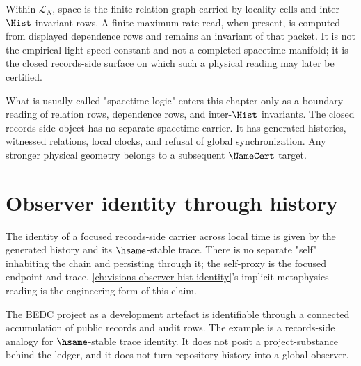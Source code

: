 \begin{example}
\label{ex:consciousness-universe-space-as-geometry}
Within $\mathcal{L}_N$, space is the finite relation graph carried by locality cells and inter-$\Hist$ invariant rows. A finite maximum-rate read, when present, is computed from displayed dependence rows and remains an invariant of that packet. It is not the empirical light-speed constant and not a completed spacetime manifold; it is the closed records-side surface on which such a physical reading may later be certified.
\end{example}

\begin{remark}
\label{rem:consciousness-universe-spacetime-logic}
What is usually called "spacetime logic" enters this chapter only as a boundary reading of relation rows, dependence rows, and inter-$\Hist$ invariants. The closed records-side object has no separate spacetime carrier. It has generated histories, witnessed relations, local clocks, and refusal of global synchronization. Any stronger physical geometry belongs to a subsequent $\NameCert$ target.
\end{remark}

\section{Observer identity through history}
\label{sec:consciousness-universe-observer-identity}

\begin{principle}
\label{prin:consciousness-universe-identity-is-history-continuity}
The identity of a focused records-side carrier across local time is given by the generated history and its $\hsame$-stable trace. There is no separate "self" inhabiting the chain and persisting through it; the self-proxy is the focused endpoint and trace. \autoref{ch:visions-observer-hist-identity}'s implicit-metaphysics reading is the engineering form of this claim.
\end{principle}

\begin{example}
\label{ex:consciousness-universe-bedc-project-identity}
The BEDC project as a development artefact is identifiable through a connected accumulation of public records and audit rows. The example is a records-side analogy for $\hsame$-stable trace identity. It does not posit a project-substance behind the ledger, and it does not turn repository history into a global observer.
\end{example}

